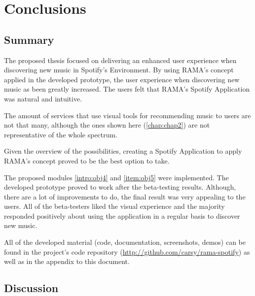 
\chapter{Conclusions}
\label{chap:chap5}

\section*{}


\section{Summary} %
\label{sec:summary}

  The proposed thesis focused on delivering an enhanced user experience when discovering new music in Spotify's Environment.
  By using RAMA's concept applied in the developed prototype, the user experience when discovering new music as been greatly increased.
  The users felt that RAMA's Spotify Application was natural and intuitive.

  The amount of services that use visual tools for recommending music to users are not that many, although the ones shown here (\ref{chap:chap2}) are not representative of the whole spectrum.

  Given the overview of the possibilities, creating a Spotify Application to apply RAMA's concept proved to be the best option to take.

  The proposed modules \ref{intro:obj4} and \ref{item:obj5} were implemented.
  The developed prototype proved to work after the beta-testing results.
  Although, there are a lot of improvements to do, the final result was very appealing to the users.
  All of the beta-testers liked the visual experience and the majority responded positively about using the application in a regular basis to discover new music.

  All of the developed material (code, documentation, screenshots, demos) can be found in the project's code repository (\url{http://github.com/carsy/rama-spotify}) as well as in the appendix to this document.


\section{Discussion} %
\label{sec:discussion}

